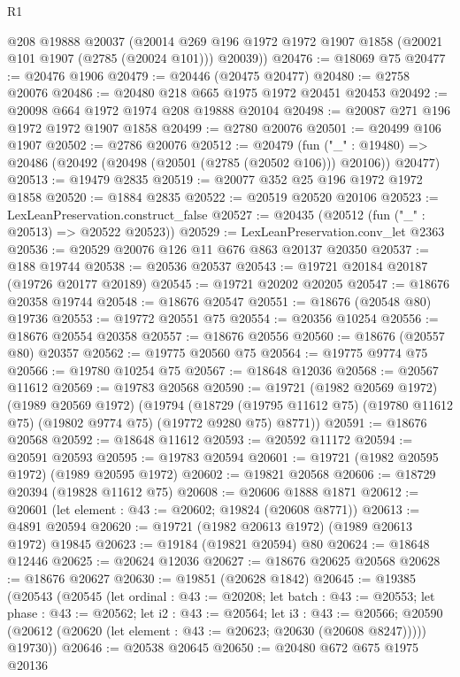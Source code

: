 \begin{lexlean}{R1}
\begin{coremodule}
      @208
      @19888
      @20037
      (@20014 @269 @196 @1972 @1972 @1907 @1858 (@20021 @101 @1907 (@2785 (@20024 @101))) @20039))
@20476 := @18069 @75
@20477 := @20476 @1906
@20479 := @20446 (@20475 @20477)
@20480 := @2758 @20076
@20486 := @20480 @218 @665 @1975 @1972 @20451 @20453
@20492 := @20098 @664 @1972 @1974 @208 @19888 @20104
@20498 := @20087 @271 @196 @1972 @1972 @1907 @1858
@20499 := @2780 @20076
@20501 := @20499 @106 @1907
@20502 := @2786 @20076
@20512 := @20479
    (fun ("_" : @19480) => @20486 (@20492 (@20498 (@20501 (@2785 (@20502 @106))) @20106)) @20477)
@20513 := @19479 @2835
@20519 := @20077 @352 @25 @196 @1972 @1972 @1858
@20520 := @1884 @2835
@20522 := @20519 @20520 @20106
@20523 := LexLeanPreservation.construct_false
@20527 := @20435 (@20512 (fun ("_" : @20513) => @20522 @20523))
@20529 := LexLeanPreservation.conv_let @2363
@20536 := @20529 @20076 @126 @11 @676 @863 @20137 @20350
@20537 := @188 @19744
@20538 := @20536 @20537
@20543 := @19721 @20184 @20187 (@19726 @20177 @20189)
@20545 := @19721 @20202 @20205
@20547 := @18676 @20358 @19744
@20548 := @18676 @20547
@20551 := @18676 (@20548 @80) @19736
@20553 := @19772 @20551 @75
@20554 := @20356 @10254
@20556 := @18676 @20554 @20358
@20557 := @18676 @20556
@20560 := @18676 (@20557 @80) @20357
@20562 := @19775 @20560 @75
@20564 := @19775 @9774 @75
@20566 := @19780 @10254 @75
@20567 := @18648 @12036
@20568 := @20567 @11612
@20569 := @19783 @20568
@20590 := @19721
    (@1982 @20569 @1972)
    (@1989 @20569 @1972)
    (@19794
      (@18729 (@19795 @11612 @75) (@19780 @11612 @75) (@19802 @9774 @75) (@19772 @9280 @75) @8771))
@20591 := @18676 @20568
@20592 := @18648 @11612
@20593 := @20592 @11172
@20594 := @20591 @20593
@20595 := @19783 @20594
@20601 := @19721 (@1982 @20595 @1972) (@1989 @20595 @1972)
@20602 := @19821 @20568
@20606 := @18729 @20394 (@19828 @11612 @75)
@20608 := @20606 @1888 @1871
@20612 := @20601 (let element : @43 := @20602; @19824 (@20608 @8771))
@20613 := @4891 @20594
@20620 := @19721 (@1982 @20613 @1972) (@1989 @20613 @1972) @19845
@20623 := @19184 (@19821 @20594) @80
@20624 := @18648 @12446
@20625 := @20624 @12036
@20627 := @18676 @20625 @20568
@20628 := @18676 @20627
@20630 := @19851 (@20628 @1842)
@20645 := @19385
    (@20543
      (@20545
        (let ordinal : @43 := @20208;
        let batch : @43 := @20553;
        let phase : @43 := @20562;
        let i2 : @43 := @20564;
        let i3 : @43 := @20566;
        @20590 (@20612 (@20620 (let element : @43 := @20623; @20630 (@20608 @8247)))))
        @19730))
@20646 := @20538 @20645
@20650 := @20480 @672 @675 @1975 @20136

\end{coremodule}
\end{lexlean}
